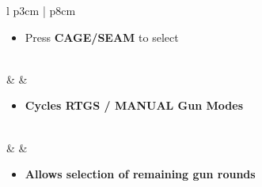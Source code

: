 \documentclass[8pt,usenames,dvipsnames,twoside]{article}
\begin{document}
\begin{center}
\begin{longtable}{l p{3cm} | p{8cm}}
\begin{minipage}[t]{\linewidth}
\begin{itemize}
\begin{itemize}
						\item Press \textbf{CAGE/SEAM} to select
					\end{itemize}
				\end{itemize}
			\end{minipage} \\
			\midrule
			\textbullet &   \hfill\null {} &
			\begin{minipage}[t]{\linewidth}
				\vspace{-7pt}
				\begin{itemize}
					\item \textbf{Cycles RTGS / MANUAL Gun Modes}
				\end{itemize}
			\end{minipage} \\
			\midrule
			\textbullet &  &
			\begin{minipage}[t]{\linewidth}
				\vspace{-7pt}
				\begin{itemize}
					\item \textbf{Allows selection of remaining gun rounds}
				\end{itemize}
			\end{minipage} \\
			\bottomrule
		\end{longtable}
	\end{center}
\end{document}
